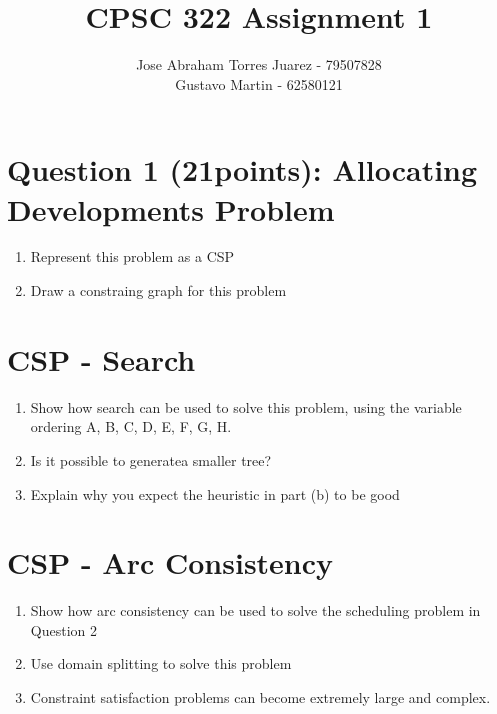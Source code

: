 \documentclass{article}
\def\ans#1{{\color{ans}#1}}
\begin{document}
\title{CPSC 322 Assignment 1}
\author{
    Jose Abraham Torres Juarez - 79507828 \\
    Gustavo Martin - 62580121
}
\date{}
\maketitle
\vspace{-2em}


\section{Question 1 (21points): Allocating Developments Problem}

\begin{enumerate}[label=(\alph*)]
    \item Represent this problem as a CSP
    \ans{
    }
    \item Draw a constraing graph for this problem
    \ans{
    }
\end{enumerate}

\clearpage
\section{CSP - Search}
\begin{enumerate}[label=(\alph*)]
    \item Show how search can be used to solve this problem, using the variable ordering A, B, C, D, E, F, G, H.
    \ans{
    }
    \item Is it  possible  to  generatea  smaller  tree? 
    \ans{
    }
    \item Explain why you expect the heuristic in part (b) to be good
    \ans{
    }
\end{enumerate}

\clearpage
\section{CSP - Arc Consistency}
\begin{enumerate}[label=(\alph*)]
    \item Show how arc consistency can be used to solve the scheduling problem in Question 2
    \ans{
    }
    \item Use domain splitting to solve this problem
    \ans{
    }
    \item Constraint satisfaction problems can become extremely large and complex.
    \ans{
    }
\end{enumerate}
\end{document}
